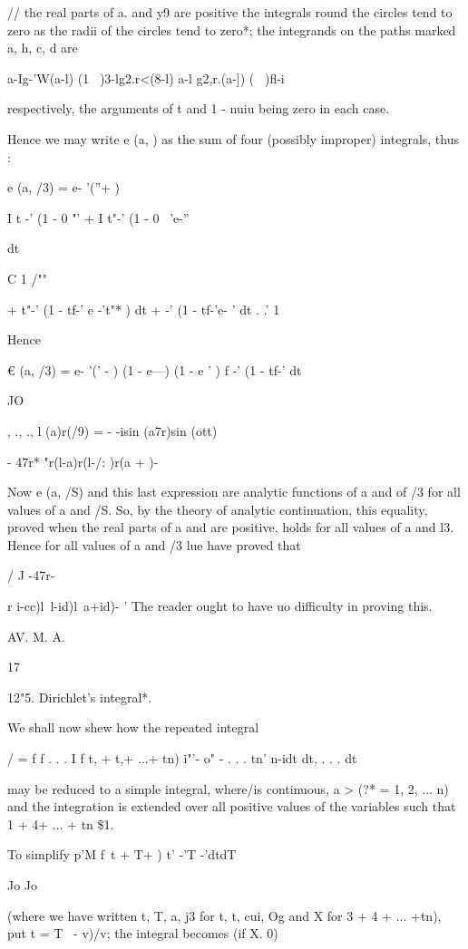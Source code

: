 // the real parts of a. and y9 are positive the integrals round the
circles tend to zero as the radii of the circles tend to zero*; the
integrands on the paths marked a, h, c, d are

 a-Ig-'W(a-l) (1 \ )3-lg2.r<(8-l) a-l g2,r.(a-]) ( \ )fl-i

respectively, the arguments of t and 1 - nuiu being zero in each case.

Hence we may write e (a, ) as the sum of four (possibly improper)
integrals, thus :

e (a, /3) = e- '(''+ )

I t -' (1 - 0 "' + I t"-' (1 - 0 ~'e-''

 dt

C 1 /""

+ t"-' (1 - tf-' e -'t"* ) dt + -' (1 - tf-'e- ' dt . .' 1

Hence

€ (a, /3) = e- '(' - ) (1 - e---) (1 - e ' ) f -' (1 - tf-' dt

JO

, ., ., l (a)r(/9) = - -isin (a7r)sin (ott) ~

- 47r* "r(l-a)r(l-/: )r(a + )-

Now e (a, /S) and this last expression are analytic functions of a and
of /3 for all values of a and /S. So, by the theory of analytic
continuation, this equality, proved when the real parts of a and are
positive, holds for all values of a and l3. Hence for all values of a
and /3 lue have proved that

/ J -47r-

r i-cc)l\ l-id)l\ a+id)- ' The reader ought to have uo difficulty in
proving this.

AV. M. A.

17

%
%

12"5. Dirichlet's integral*.

We shall now shew how the repeated integral

/ = f f . . . I f t, + t,+ ...+ tn) i"'- o" - . . . tn' n-idt dt, . .
. dt

may be reduced to a simple integral, where/is continuous, a > (?* = 1,
2, ... n) and the integration is extended over all positive values of
the variables such that 1 + 4+ ... + tn \$1.

To simplify p'M f\ t + T+ ) t' -'T -'dtdT

Jo Jo

(where we have written t, T, a, j3 for t, t, cui, Og and X for 3 + 4
+ ... +tn), put t = T \ - v)/v; the integral becomes (if X. 0)

